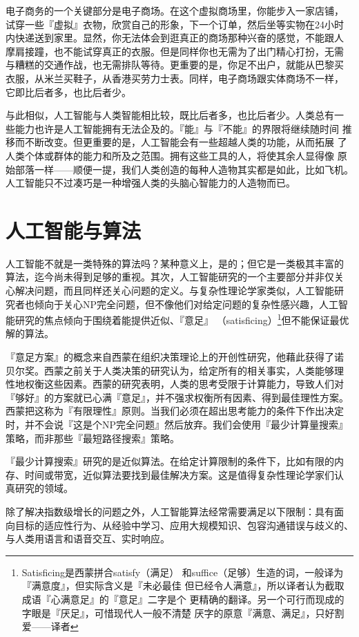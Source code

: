 \documentclass[12pt,a4paper]{article}
\begin{document}
电子商务的一个关键部分是电子商场。在这个虚拟商场里，你能步入一家店铺，
试穿一些『虚拟』衣物，欣赏自己的形象，下一个订单，然后坐等实物在24小时
内快递送到家里。显然，你无法体会到逛真正的商场那种兴奋的感觉，不能跟人
摩肩接蹱，也不能试穿真正的衣服。但是同样你也无需为了出门精心打扮，无需
与糟糕的交通作战，也无需排队等待。更重要的是，你足不出户，就能从巴黎买
衣服，从米兰买鞋子，从香港买劳力士表。同样，电子商场跟实体商场不一样，
它即比后者多，也比后者少。

与此相似，人工智能与人类智能相比较，既比后者多，也比后者少。人类总有一
些能力也许是人工智能拥有无法企及的。『能』与『不能』的界限将继续随时间
推移而不断改变。但更重要的是，人工智能会有一些超越人类的功能，从而拓展
了人类个体或群体的能力和所及之范围。拥有这些工具的人，将使其余人显得像
原始部落一样——顺便一提，我们人类创造的每种人造物其实都是如此，比如飞机。
人工智能只不过凑巧是一种增强人类的头脑心智能力的人造物而已。

\section{人工智能与算法}

人工智能不就是一类特殊的算法吗？某种意义上，是的；但它是一类极其丰富的
算法，迄今尚未得到足够的重视。其次，人工智能研究的一个主要部分并非仅关
心解决问题，而且同样还关心问题的定义。与复杂性理论学家类似，人工智能研
究者也倾向于关心NP完全问题，但不像他们对给定问题的复杂性感兴趣，人工智
能研究的焦点倾向于围绕着能提供近似、『意足』
（satisficing）\footnote{Satisficing是西蒙拼合satisfy（满足）
  和suffice（足够）生造的词，一般译为『满意度』，但实际含义是『未必最佳
  但已经令人满意』，所以译者认为截取成语『心满意足』的『意足』二字是个
  更精确的翻译。另一个可行而现成的字眼是『厌足』，可惜现代人一般不清楚
  厌字的原意『满意、满足』，只好割爱——译者}但不能保证最优解的算法。

『意足方案』的概念来自西蒙在组织决策理论上的开创性研究，他藉此获得了诺
贝尔奖。西蒙之前关于人类决策的研究认为，给定所有的相关事实，人类能够理
性地权衡这些因素。西蒙的研究表明，人类的思考受限于计算能力，导致人们对
『够好』的方案就已心满『意足』，并不强求权衡所有因素、得到最佳理性方案。
西蒙把这称为『有限理性』原则。当我们必须在超出思考能力的条件下作出决定
时，并不会说『这是个NP完全问题』然后放弃。我们会使用『最少计算量搜索』
策略，而非那些『最短路径搜索』策略。

『最少计算搜索』研究的是近似算法。在给定计算限制的条件下，比如有限的内
存、时间或带宽，近似算法要找到最佳解决方案。这是值得复杂性理论学家们认
真研究的领域。

除了解决指数级增长的问题之外，人工智能算法经常需要满足以下限制：具有面
向目标的适应性行为、从经验中学习、应用大规模知识、包容沟通错误与歧义的、
与人类用语言和语音交互、实时响应。
\end{document}
